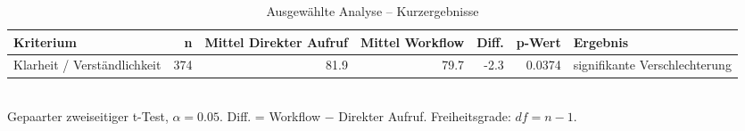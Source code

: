 \begin{table}[htbp]
\centering
\caption{Ausgewählte Analyse -- Kurzergebnisse}
\begin{tabular}{lrrrrrl}
\toprule
Kriterium & n & Mittel Direkter Aufruf & Mittel Workflow & Diff. & p-Wert & Ergebnis \\
\midrule
Klarheit / Verständlichkeit & 374 & 81.9 & 79.7 & -2.3 & 0.0374 & signifikante Verschlechterung \\
\bottomrule
\end{tabular}
\\[2mm]
\footnotesize Gepaarter zweiseitiger t-Test, $\alpha=0.05$. Diff. = Workflow $-$ Direkter Aufruf. Freiheitsgrade: $df=n-1$.
\end{table}
